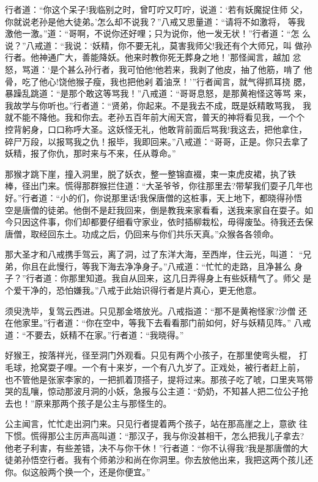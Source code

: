 行者道：“你这个呆子!我临别之时，曾叮咛又叮咛，说道：‘若有妖魔捉住师
父，你就说老孙是他大徒弟。’怎么却不说我？”八戒又思量道：“请将不如激将，
等我激他一激。”道：“哥啊，不说你还好哩；只为说你，他一发无状！”行者道：“怎
么说？”八戒道：“我说：‘妖精，你不要无礼，莫害我师父!我还有个大师兄，叫
做孙行者。他神通广大，善能降妖。他来时教你死无葬身之地！’那怪闻言，越加
忿怒，骂道：‘是个甚么孙行者，我可怕他!他若来，我剥了他皮，抽了他筋，啃了
他骨，吃了他心!饶他猴子瘦，我也把他剁着油烹！’”行者闻言，就气得抓耳挠
腮，暴躁乱跳道：“是那个敢这等骂我！”八戒道：“哥哥息怒，是那黄袍怪这等骂
来，我故学与你听也。”行者道：“贤弟，你起来。不是我去不成，既是妖精敢骂我，
我就不能不降他。我和你去。老孙五百年前大闹天宫，普天的神将看见我，一个个
控背躬身，口口称呼大圣。这妖怪无礼，他敢背前面后骂我!我这去，把他拿住，
碎尸万段，以报骂我之仇！报毕，我即回来。”八戒道：“哥哥，正是。你只去拿了
妖精，报了你仇，那时来与不来，任从尊命。”

那猴才跳下崖，撞入洞里，脱了妖衣，整一整锦直裰，束一束虎皮裙，执了铁
棒，径出门来。慌得那群猴拦住道：“大圣爷爷，你往那里去?带挈我们耍子几年也
好。”行者道：“小的们，你说那里话!我保唐僧的这桩事，天上地下，都晓得孙悟
空是唐僧的徒弟。他倒不是赶我回来，倒是教我来家看看，送我来家自在耍子。如
今只因这件事，你们却都要仔细看守家业，依时插柳栽松，毋得废坠。待我还去保
唐僧，取经回东土。功成之后，仍回来与你们共乐天真。”众猴各各领命。

那大圣才和八戒携手驾云，离了洞，过了东洋大海，至西岸，住云光，叫道：
“兄弟，你且在此慢行，等我下海去净净身子。”八戒道：“忙忙的走路，且净甚么
身子？”行者道：你那里知道。我自从回来，这几日弄得身上有些妖精气了。师父
是个爱干净的，恐怕嫌我。”八戒于此始识得行者是片真心，更无他意。

须臾洗毕，复驾云西进。只见那金塔放光。八戒指道：“那不是黄袍怪家?沙僧
还在他家里。”行者道：“你在空中，等我下去看看那门前如何，好与妖精见阵。”
八戒道：“不要去，妖精不在家。”行者道：“我晓得。”

好猴王，按落祥光，径至洞门外观看。只见有两个小孩子，在那里使弯头棍，
打毛球，抢窝耍子哩。一个有十来岁，一个有八九岁了。正戏处，被行者赶上前，
也不管他是张家李家的，一把抓着顶搭子，提将过来。那孩子吃了唬，口里夹骂带
哭的乱嚷，惊动那波月洞的小妖，急报与公主道：“奶奶，不知甚人把二位公子抢
去也！”原来那两个孩子是公主与那怪生的。

公主闻言，忙忙走出洞门来。只见行者提着两个孩子，站在那高崖之上，意欲
往下惯。慌得那公主厉声高叫道：“那汉子，我与你没甚相干，怎么把我儿子拿去?
他老子利害，有些差错，决不与你干休！”行者道：“你不认得我?我是那唐僧的大
徒弟孙悟空行者。我有个师弟沙和尚在你洞里。你去放他出来，我把这两个孩儿还
你。似这般两个换一个，还是你便宜。”


